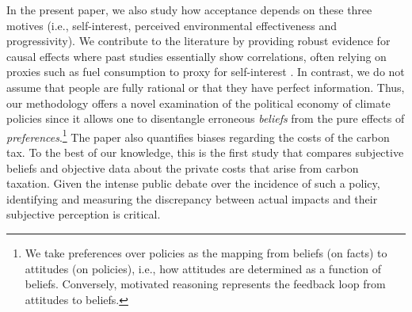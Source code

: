 \documentclass[12pt]{article} %
\begin{document}
In the present paper, we also study how acceptance depends on these three motives (i.e., self-interest, perceived environmental effectiveness and progressivity). We contribute to the literature by providing robust evidence for causal effects where past studies essentially show correlations, often relying on proxies such as fuel consumption to proxy for self-interest \citep[e.g.,][]{thalmann_public_2004,kallbekken_saelen_2011,anderson_can_2019}. In contrast, we do not assume that people are fully rational or that they have perfect information. Thus, our methodology offers a novel examination of the political economy of climate policies since it allows one to disentangle erroneous \emph{beliefs} from the pure effects of \emph{preferences}.\footnote{We take preferences over policies as the mapping from beliefs (on facts) to attitudes (on policies), i.e., how attitudes are determined as a function of beliefs. Conversely, motivated reasoning represents the feedback loop from attitudes to beliefs.} The paper also quantifies biases regarding the costs of the carbon tax. To the best of our knowledge, this is the first study that compares subjective beliefs and objective data about the private costs that arise from carbon taxation. Given the intense public debate over the incidence of such a policy, identifying and measuring the discrepancy between actual impacts and their subjective perception is critical.




\end{document}
